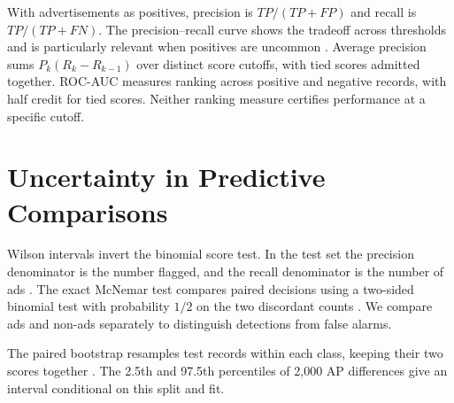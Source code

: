 With advertisements as positives, precision is \(TP/(TP+FP)\) and
recall is \(TP/(TP+FN)\). The precision--recall curve shows the tradeoff across thresholds and is
particularly relevant when positives are uncommon \citep{davis2006}.
Average precision sums \(P_k(R_k-R_{k-1})\) over distinct score
cutoffs, with tied scores admitted together. ROC-AUC measures ranking
across positive and negative records, with half credit for tied scores.
Neither ranking measure certifies performance at a specific cutoff.


\section{Uncertainty in Predictive Comparisons}
Wilson intervals invert the binomial score test. In the test set the
precision denominator is the number flagged, and the recall denominator
is the number of ads \citep{rWilson}. The exact McNemar test compares
paired decisions using a two-sided binomial test with probability $1/2$
on the two discordant counts \citep{rBinomial}. We compare ads and
non-ads separately to distinguish detections from false alarms.

The paired bootstrap resamples test records within each class, keeping
their two scores together \citep{efron1979}. The 2.5th and 97.5th percentiles
of 2,000 AP differences give an interval conditional on this split and fit.
